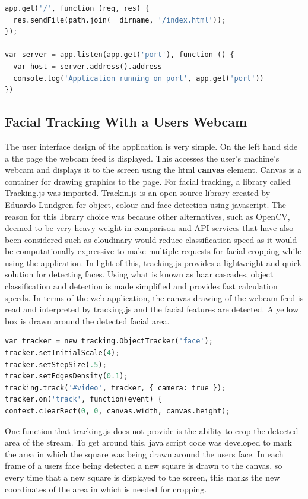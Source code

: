 \begin{lstlisting}[language=python, frame=single]
app.get('/', function (req, res) {
  res.sendFile(path.join(__dirname, '/index.html'));
});

var server = app.listen(app.get('port'), function () {
  var host = server.address().address
  console.log('Application running on port', app.get('port'))
})
\end{lstlisting}

\subsection{Facial Tracking With a Users Webcam}

The user interface design of the application is very simple. On the left hand side a the page the webcam feed is displayed. This accesses the user's machine's webcam and displays it to the screen using the html \textbf{canvas} element. Canvas is a container for drawing graphics to the page. For facial tracking, a library called Tracking.js was imported. Trackin.js is an open source library created by Eduardo Lundgren for object, colour and face detection using javascript. The reason for this library choice was because other alternatives, such as OpenCV, deemed to be very heavy weight in comparison and API services that have also been considered such as cloudinary would reduce classification speed as it would be computationally expressive to make multiple requests for facial cropping while using the application. 
In light of this, tracking.js provides a lightweight and quick solution for detecting faces. Using what is known as haar cascades, object classification and detection is made simplified and provides fast calculation speeds. In terms of the web application, the canvas drawing of the webcam feed is read and interpreted by tracking.js and the facial features are detected. A yellow box is drawn around the detected facial area.
\begin{lstlisting}[language=python, frame=single]
var tracker = new tracking.ObjectTracker('face');
tracker.setInitialScale(4);
tracker.setStepSize(.5);
tracker.setEdgesDensity(0.1);
tracking.track('#video', tracker, { camera: true });
tracker.on('track', function(event) {
context.clearRect(0, 0, canvas.width, canvas.height);
\end{lstlisting}

One function that tracking.js does not provide is the ability to crop the detected area of the stream. To get around this, java script code was developed to mark the area in which the square was being drawn around the users face. In each frame of a users face being detected a new square is drawn to the canvas, so every time that a new square is displayed to the screen, this marks the new coordinates of the area in which is needed for cropping. 

